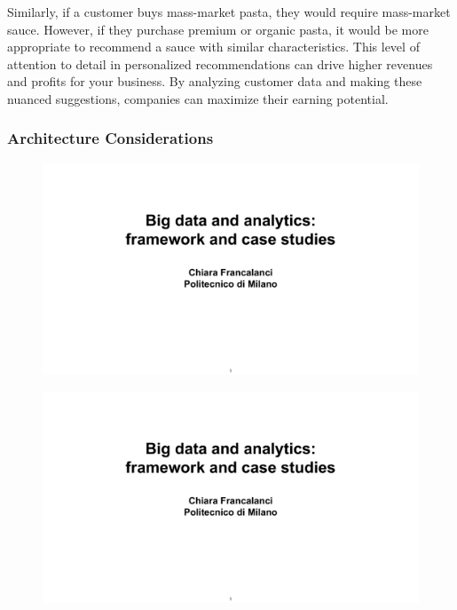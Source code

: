 Similarly, if a customer buys mass-market pasta, they would require
mass-market sauce. However, if they purchase premium or organic pasta,
it would be more appropriate to recommend a sauce with similar
characteristics. This level of attention to detail in personalized
recommendations can drive higher revenues and profits for your business.
By analyzing customer data and making these nuanced suggestions,
companies can maximize their earning potential.

\subsubsection{Architecture Considerations}

\begin{figure}[!h]
    \centering
    \includegraphics[page=97, trim = 0cm 2cm 0cm 4.5cm, clip, width=\textwidth]{images/06 - BIG_DATA.pdf}
\end{figure}

\begin{figure}[!h]
    \centering
    \includegraphics[page=98, trim = 0cm 9cm 1.5cm 4.8cm, clip, width=\textwidth]{images/06 - BIG_DATA.pdf}
\end{figure}

